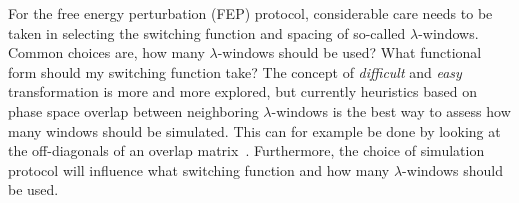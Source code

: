 \documentclass[9pt,bestpractices]{livecoms}
\begin{document}
For the free energy perturbation (FEP) protocol, considerable care needs to be taken in selecting the switching function and spacing of so-called $\lambda$-windows. Common choices are, how many $\lambda$-windows should be used? What functional form should my switching function take? The concept of \textit{difficult} and \textit{easy} transformation is more and more explored, but currently heuristics based on phase space overlap between neighboring $\lambda$-windows is the best way to assess how many windows should be simulated. This can for example be done by looking at the off-diagonals of an overlap matrix~\cite{klimovich_guidelines_2015,kuhn_assessment_2020}. Furthermore, the choice of simulation protocol will influence what switching function and how many $\lambda$-windows should be used. 
\end{document}
